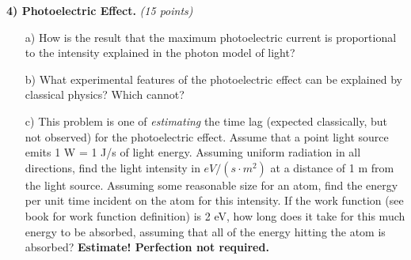 {%

\textbf{4) Photoelectric Effect. } \hfill \textit{(15 points)}
\begin{itemize}
\item[a)]How is the result that the maximum photoelectric current is proportional to the intensity explained in the photon model of light?
\item[b)]What experimental features of the photoelectric effect can be explained by classical physics? Which cannot?
\item[c)]
This problem is one of \textit{estimating} the time lag (expected classically, but not observed) for the photoelectric effect. 
Assume that a point light source emits 1 W = 1 J/s of light energy.
Assuming uniform radiation in all directions, find the light intensity in $eV/(s \cdot m^2)$ at a distance of 1 m from the light source. 
Assuming some reasonable size for an atom, find the energy per unit time incident on the atom for this intensity. 
If the work function (see book for work function definition) is 2 eV, how long does it take for this much energy to be absorbed, assuming that all of the energy hitting the atom is absorbed?
\textbf{Estimate! Perfection not required. }
\end{itemize}



}
